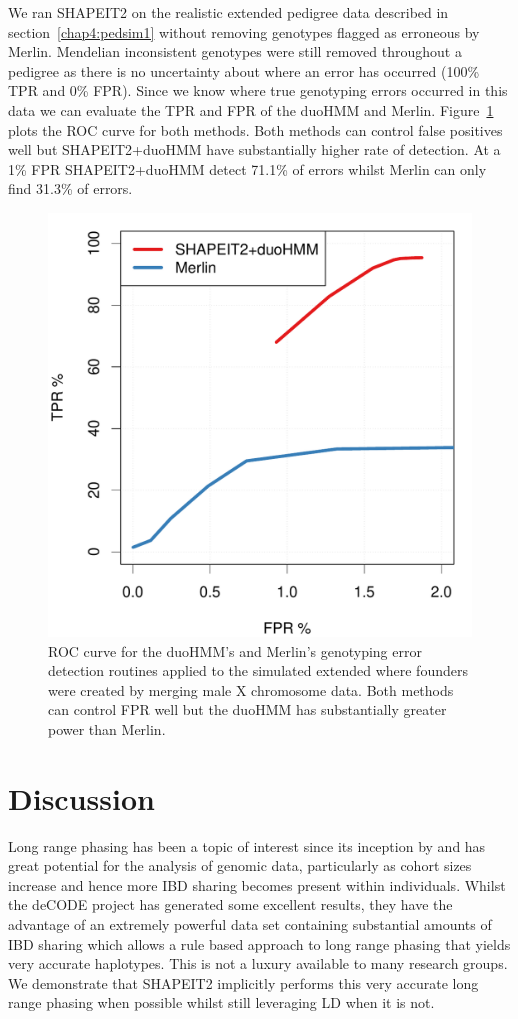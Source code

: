 We ran SHAPEIT2 on the realistic extended pedigree data described in section~\ref{chap4:pedsim1} without removing genotypes flagged as erroneous by Merlin. Mendelian inconsistent genotypes were still removed throughout a pedigree as there is no uncertainty about where an error has occurred (100\% TPR and 0\% FPR).  Since we know where true genotyping errors occurred in this data we can evaluate the TPR and FPR of the duoHMM and Merlin. Figure~\ref{generr-roc} plots the ROC curve for both methods.  Both methods can control false positives well but SHAPEIT2+duoHMM have substantially higher rate of detection.  At a 1\% FPR SHAPEIT2+duoHMM detect 71.1\% of errors whilst Merlin can only find 31.3\% of errors.  %


\begin{figure}
\centering
   \includegraphics[width=.45\textwidth]{chap4figs/error_detection}%
\caption[ROC curve for the DuoHMM and Merlin genotyping error detection]{ROC curve for the duoHMM's and Merlin's genotyping error detection routines applied to the simulated extended where founders were created by merging male X chromosome data.  Both methods can control FPR well but the duoHMM has substantially greater power than Merlin.\label{generr-roc}}
\end{figure}

\clearpage
\section{Discussion}

Long range phasing has been a topic of interest since its inception by \cite{kong2008detection} and has great potential for the analysis of genomic data, particularly as cohort sizes increase and hence more IBD sharing becomes present within individuals.  Whilst the deCODE project has generated some excellent results, they have the advantage of an extremely powerful data set containing substantial amounts of IBD sharing which allows a rule based approach to long range phasing that yields very accurate haplotypes.  This is not a luxury available to many research groups. We demonstrate that SHAPEIT2 implicitly performs this very accurate long range phasing when possible whilst still leveraging LD when it is not.

